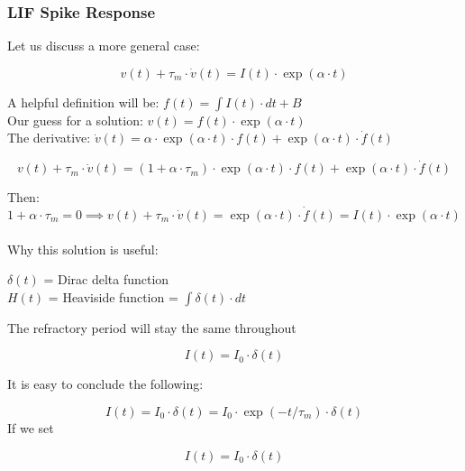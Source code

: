 \subsubsection{LIF Spike Response}

Let us discuss a more general case:

\begin{equation}
    v(t) + \tau_m \cdot \dot{v}(t) = I(t) \cdot \exp(\alpha \cdot t)
\end{equation}
    
A helpful definition will be: \(f(t) = \int I(t) \cdot dt + B\) \\
Our guess for a solution: \(v(t) = f(t) \cdot \exp(\alpha \cdot t)\) \\
The derivative: \(\dot{v}(t) = \alpha \cdot \exp(\alpha \cdot t) \cdot f(t) + \exp(\alpha \cdot t) \cdot \dot{f}(t)\)
    
\begin{equation}
    v(t) + \tau_m \cdot \dot{v}(t) = (1 + \alpha \cdot \tau_m) \cdot \exp(\alpha \cdot t) \cdot f(t) + \exp(\alpha \cdot t) \cdot \dot{f}(t)
\end{equation}

Then:
\begin{equation} 
    1 + \alpha \cdot \tau_m = 0 \implies v(t) + \tau_m \cdot \dot{v}(t) = \exp(\alpha \cdot t) \cdot \dot{f}(t) = I(t) \cdot \exp(\alpha \cdot t) \label{eq:LIF-exp-sol}
\end{equation}\\


Why this solution is useful:

\(\delta(t)\) = Dirac delta function \\
\(H(t)\) = Heaviside function = \(\int \delta(t) \cdot dt\) 

The refractory period will stay the same throughout  

\begin{equation}
	I(t) = I_0 \cdot \delta(t)
\end{equation}

It is easy to conclude the following: 

\begin{equation}
	I(t) = I_0 \cdot \delta(t) = I_0 \cdot \exp(-t/\tau_m) \cdot \delta(t)
\end{equation}
If we set 

\begin{equation}
	I(t) = I_0 \cdot \delta(t)
\end{equation}

